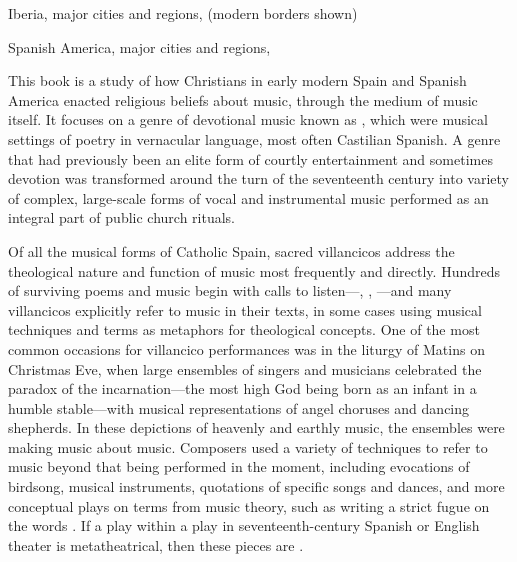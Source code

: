 
{Iberia, major cities and regions,  (modern borders shown)}

{Spanish America, major cities and regions, }

This book is a study of how Christians in early modern Spain and Spanish
America enacted religious beliefs about music, through the medium of music
itself.
It focuses on a genre of devotional music known as , which
were musical settings of poetry in vernacular language, most often Castilian
Spanish.
A genre that had previously been an elite form of courtly entertainment and
sometimes devotion was transformed around the turn of the seventeenth century
into variety of complex, large-scale forms of vocal and instrumental music
performed as an integral part of public church rituals.%
    \Autocites
    {Torrente:VC-chapter}
    {Laird:VC}
    {Knighton-Torrente:VCs}
    {Borrego-Marin:Villancico}
    {Illari:Polychoral}
    {CaberoPueyo:PhD}
    {Swadley:VillancicoPhD}
    {ChavezBarcenas:PhD}
    {Castillo:ChantLiturgyReform}

Of all the musical forms of Catholic Spain, sacred villancicos address the
theological nature and function of music most frequently and directly.
Hundreds of surviving poems and music begin with calls to
listen---, , ---and many
villancicos explicitly refer to music in their texts, in some cases using
musical techniques and terms as metaphors for theological concepts.
One of the most common occasions for villancico performances was in the liturgy
of Matins on Christmas Eve, when large ensembles of singers and musicians
celebrated the paradox of the incarnation---the most high God being born
as an infant in a humble stable---with musical representations of
angel choruses and dancing shepherds.
In these depictions of heavenly and earthly music, the ensembles were making
music about music.
Composers used a variety of techniques to refer to music beyond that being
performed in the moment, including evocations of birdsong, musical instruments,
quotations of specific songs and dances, and more conceptual plays on terms
from music theory, such as writing a strict fugue on the words
.
If a play within a play in seventeenth-century Spanish or English theater is
metatheatrical, then these pieces are .

